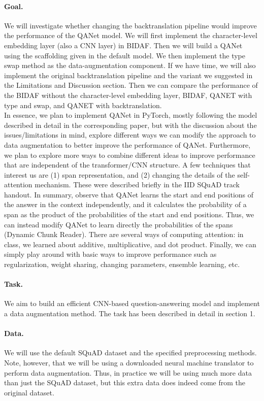 \documentclass{article}
\begin{document}
\paragraph{Goal.} 
We will investigate whether changing the backtranslation pipeline would improve the performance of the QANet model. We will first implement the character-level embedding layer (also a CNN layer) in BIDAF. Then we will build a QANet using the scaffolding given in the default model. We then implement the type swap method as the data-augmentation component. If we have time, we will also implement the original backtranslation pipeline and the variant we suggested in the Limitations and Discussion section. Then we can compare the performance of the BIDAF without the character-level embedding layer, BIDAF, QANET with type and swap, and QANET with backtranslation. \\
In essence, we plan to implement QANet in PyTorch, mostly following the model described in detail in the corresponding paper, but with the discussion about the issues/limitations in mind, explore different ways we can modify the approach to data augmentation to better improve the performance of QANet. Furthermore, we plan to explore more ways to combine different ideas to improve performance that are independent of the transformer/CNN structure. A few techniques that interest us are (1) span representation, and (2) changing the details of the self-attention mechanism. These were described briefly in the IID SQuAD track handout. In summary, observe that QANet learns the start and end positions of the answer in the context independently, and it calculates the probability of a span as the product of the probabilities of the start and end positions. Thus, we can instead modify QANet to learn directly the probabilities of the spans (Dynamic Chunk Reader). There are several ways of computing attention: in class, we learned about additive, multiplicative, and dot product. Finally, we can simply play around with basic ways to improve performance such as regularization, weight sharing, changing parameters, ensemble learning, etc.


\paragraph{Task.} 
We aim to build an efficient CNN-based question-answering model and implement a data augmentation method. The task has been described in detail in section 1.

\paragraph{Data.}
We will use the default SQuAD dataset and the specified preprocessing methods. Note, however, that we will be using a downloaded neural machine translator to perform data augmentation. Thus, in practice we will be using much more data than just the SQuAD dataset, but this extra data does indeed come from the original dataset.
\end{document}
